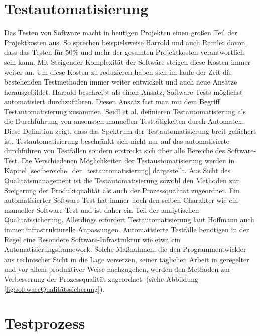 \section{Testautomatisierung}
\label{sec:testautoGrundlagen}
Das Testen von Software macht in heutigen Projekten einen großen Teil der Projektkosten aus. So sprechen beispielsweise Harrold \cite{harrold_testing:_2000} und auch Ramler \cite{ramler_economic_2006} davon, dass das Testen für 50\% 
und mehr der gesamten Projektkosten verantwortlich sein kann. 
Mit Steigender Komplexität der Softwäre steigen diese Kosten immer weiter an.  
Um diese Kosten zu reduzieren haben sich im laufe der Zeit die bestehenden Testmethoden immer weiter entwickelt und auch neue Ansätze herausgebildet. Harrold \cite{harrold_testing:_2000} beschreibt als einen Ansatz, Software-Tests möglichst automatisiert durchzuführen. Diesen Ansatz fast man mit dem Begriff Testautomatisierung zusammen.
Seidl et al. \cite[S.7]{seidl_basiswissen_2012} definieren Testautomatisierung als \glqq die Durchführung von ansonsten manuellen Testtätigkeiten durch Automaten.\grqq
Diese Definition zeigt, dass das Spektrum der Testautomatisierung breit gefächert ist. Testautomatisierung beschränkt sich nicht nur auf das automatisierte durchführen von Testfällen sondern erstreckt sich über alle Bereiche des Software-Test. Die Verschiedenen Möglichkeiten der Testaustomatisierung werden in Kapitel \ref{sec:bereiche_der_testautomatisierung} dargestellt.
Aus Sicht des Qualitätsmanagement ist die Testautomatisierung sowohl den Methoden zur Steigerung der Produktqualität als auch der Prozessqualität zugeordnet. Ein automatisierter Software-Test hat immer noch den selben Charakter wie ein manueller Software-Test und ist daher ein Teil der analytischen Qualitätssicherung. Allerdings erfordert Testautomatisierung laut Hoffmann \cite[vgl. Seite 25]{hoffmann_software-qualitat_2013} auch immer infrastrukturelle Anpassungen. Automatisierte Testfälle benötigen in der Regel eine Besondere Software-Infrastruktur wie etwa ein Automatisierungsframework. Solche Maßnahmen, die den Programmentwickler aus technischer Sicht in die Lage versetzen, seiner täglichen Arbeit in geregelter und vor allem produktiver Weise nachzugehen, werden den Methoden zur Verbesserung der Prozessqualität zugeordnet. (siehe Abbildung \ref{fig:softwareQualitätssicherung}).



\section{Testprozess}
\label{sec:testprozess}

